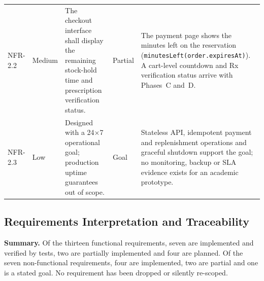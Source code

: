 \documentclass[11pt,a4paper]{article}
\begin{document}
{\begin{longtable}{@{}L{1.55cm}L{1.55cm}L{5.30cm}L{2.04cm}L{4.44cm}@{}}
NFR-2.2 & Medium & The checkout interface shall display the remaining stock-hold time and prescription verification status. & Partial & The payment page shows the minutes left on the reservation (\texttt{minutesLeft(order.expiresAt)}). A cart-level countdown and Rx verification status arrive with Phases~C and~D.\\
NFR-2.3 & Low & Designed with a 24$\times$7 operational goal; production uptime guarantees out of scope. & Goal & Stateless API, idempotent payment and replenishment operations and graceful shutdown support the goal; no monitoring, backup or SLA evidence exists for an academic prototype.\\
\end{longtable}
}

\subsection{Requirements Interpretation and Traceability}
\textbf{Summary.} Of the thirteen functional requirements, seven are implemented and
verified by tests, two are partially implemented and four are planned. Of the seven
non-functional requirements, four are implemented, two are partial and one is a
stated goal. No requirement has been dropped or silently re-scoped.
\end{document}
